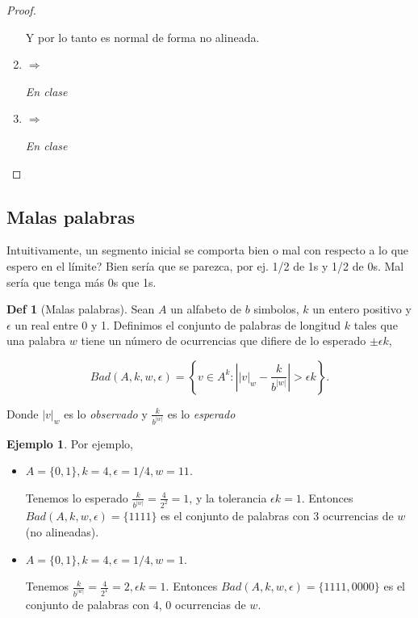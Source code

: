 \documentclass{report}
\theoremstyle{definition} %
\newtheorem*{definition*}{Def}
\newtheorem*{exmp*}{Ejemplo}
\begin{document}
\begin{proof}
\begin{enumerate}
    Y por lo tanto es normal de forma no alineada.

    \item {} $\Rightarrow$ 
    
    \textit{En clase}

    \item {} $\Rightarrow$ 

    \textit{En clase}

\end{enumerate}
\end{proof}

\subsection{Malas palabras}

Intuitivamente, un segmento inicial se comporta bien o mal con respecto a lo que
espero en el límite? Bien sería que se parezca, por ej. 1/2 de 1s y 1/2 de 0s.
Mal sería que tenga más 0s que 1s.

\begin{definition*}[Malas palabras]
    Sean $A$ un alfabeto de $b$ simbolos, $k$ un entero positivo y $\epsilon$ un
    real entre 0 y 1. Definimos el conjunto de palabras de longitud $k$ tales
    que una palabra $w$ tiene un número de ocurrencias que difiere de lo
    esperado $\pm \epsilon k$,

    $$Bad(A, k, w, \epsilon) = \left\{
        v \in A^k : 
            \left|
                |v|_w -
                \frac{k}{b^{|w|}}
            \right| > \epsilon k
    \right\}.$$

    Donde $|v|_w$ es lo \textit{observado} y $\frac{k}{b^{|w|}}$ es lo
    \textit{esperado}
\end{definition*}
\begin{exmp*} Por ejemplo,
    \begin{itemize}
        \item $A = \{ 0, 1 \}, k = 4, \epsilon = 1/4, w = 11$.
        
        Tenemos lo esperado $\frac{k}{b^{|w|}} = \frac{4}{2^2} = 1$, y la
        tolerancia $\epsilon k = 1$.
        Entonces $Bad(A, k, w, \epsilon) = \{1111\}$ es el conjunto de palabras
        con 3 ocurrencias de $w$ (no alineadas).

        \item $A = \{ 0, 1 \}, k = 4, \epsilon = 1/4, w = 1$.

        Tenemos $\frac{k}{b^{|w|}} = \frac{4}{2^1} = 2, \epsilon k = 1$.
        Entonces $Bad(A, k, w, \epsilon) = \{1111, 0000\}$ es el conjunto de palabras
        con 4, 0 ocurrencias de $w$.
    \end{itemize}
\end{exmp*}
\end{document}
